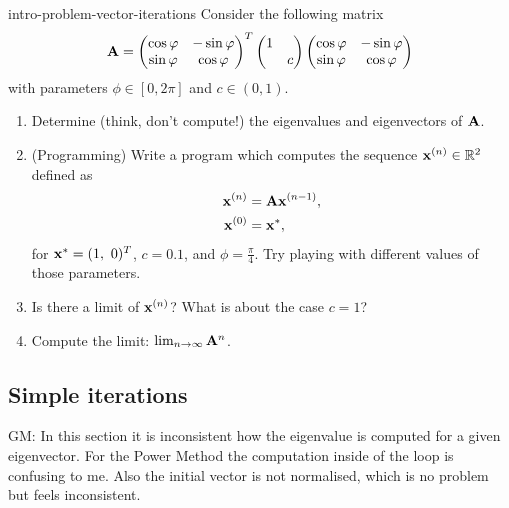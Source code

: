 
\begin{Problem}{intro-problem-vector-iterations}
	Consider the following matrix
	\begin{gather*}
	\mathbf A =
	\begin{pmatrix}
	\cos\varphi & -\sin\varphi\\
	\sin\varphi &  \cos\varphi
	\end{pmatrix}^T
	\begin{pmatrix}
	1 & \\
	& c
	\end{pmatrix}
	\begin{pmatrix}
	\cos\varphi & -\sin\varphi\\
	\sin\varphi &  \cos\varphi
	\end{pmatrix}
	\end{gather*}
	with parameters $\phi\in[0,2\pi]$ and $c\in(0,1)$.
	\begin{enumerate}
		\item Determine (think, don't compute!) the eigenvalues and eigenvectors of $\mathbf A$.
		\item (Programming) Write a program which computes the sequence
		$\mathbf x^{(n)}\in\mathbb R^2$ defined as
		\begin{align*}
		\mathbf x^{(n)} &= \mathbf A \mathbf x^{(n-1)}, \\
		\mathbf x^{(0)} &= \mathbf x^{*},
		\end{align*}
		for $\vx^{*} = (1,\ 0)^T$, $c = 0.1$, and
		$\phi=\frac\pi4$. Try playing with different values of those
		parameters.
		\item Is there a limit of $\mathbf x^{(n)}$? What is about the case
		$c=1$?
		\item Compute the limit: $\lim_{n\to\infty}\mathbf A^n$.
	\end{enumerate}
\end{Problem}

\subsection{Simple iterations}

\begin{todo}
  GM:
  In this section it is inconsistent how the eigenvalue is computed for a given eigenvector. For the Power Method the
  computation inside of the loop is confusing to me. Also the initial vector is not normalised, which is no problem but feels
  inconsistent.
\end{todo}


